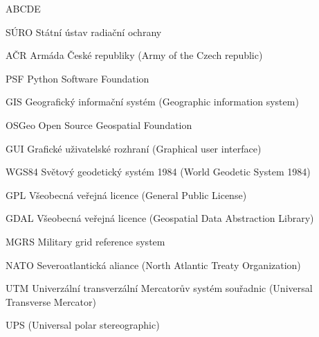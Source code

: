 
\begin{seznamzkratek}{ABCDE}

	      {SÚRO}
	      {Státní ústav radiační ochrany}
	      
	     {AČR}
	     {Armáda České republiky (Army of the Czech republic)}	      
	      
		  {PSF}
	      {Python Software Foundation}

	      {GIS}
	      {Geografický informační systém (Geographic information system)}

	      {OSGeo}
	      {Open Source Geospatial Foundation}
	         
	      {GUI}
	      {Grafické uživatelské rozhraní (Graphical user interface)}
	           
	      {WGS84}
	      {Světový geodetický systém 1984 (World Geodetic System 1984)}

	      {GPL}
	      {Všeobecná veřejná licence (General Public License)}
	      
	      {GDAL}
	      {Všeobecná veřejná licence (Geospatial Data Abstraction Library)}
	    
	      {MGRS}
	      {Military grid reference system}
	      
	      {NATO}
	      {Severoatlantická aliance (North Atlantic Treaty Organization)}
	      
	      {UTM}
	      {Univerzální transverzální Mercatorův systém souřadnic (Universal Transverse Mercator)}	
	      
	      {UPS}
	      {(Universal polar stereographic)}	            	      

\end{seznamzkratek}